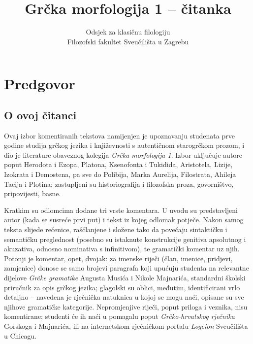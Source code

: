 \documentclass[a4paper,12pt,twoside]{report}
\newcommand{\subtitle}[1]{%
  \posttitle{%
    \par\end{center}
    \begin{center}\large#1\end{center}
    \vskip0.5em}%
}
\begin{document}
\title{Grčka morfologija 1 – čitanka}
\subtitle{Vježbe 1–20}
\author{Odsjek za klasičnu filologiju\\
Filozofski fakultet Sveučilišta u Zagrebu}
\maketitle

\clearpage
\thispagestyle{empty}




\chapter*{Predgovor}

\section*{O ovoj čitanci}

Ovaj izbor komentiranih tekstova namijenjen je upoznavanju studenata prve godine studija grčkog jezika i književnosti s autentičnom starogrčkom prozom, i dio je literature obaveznog kolegija \textit{Grčka morfologija 1}. Izbor uključuje autore poput Herodota i Ezopa, Platona, Ksenofonta i Tukidida, Aristotela, Lizije, Izokrata i Demostena, pa sve do Polibija, Marka Aurelija, Filostrata, Ahileja Tacija i Plotina; zastupljeni su historiografija i filozofska proza, govorništvo, pripovijesti, basne.

Kratkim su odlomcima dodane tri vrste komentara. U uvodu su predstavljeni autor (kada se susreće prvi put) i tekst iz kojeg odlomak potječe. Nakon samog teksta slijede rečenice, raščlanjene i složene tako da povećaju sintaktičku i semantičku preglednost (posebno su istaknute konstrukcije genitiva apsolutnog i akuzativa, odnosno nominativa s infinitivom), te gramatički komentar uz njih. Potonji je komentar, opet, dvojak: za imenske riječi (član, imenice, pridjevi, zamjenice) donose se samo brojevi paragrafa koji upućuju studenta na relevantne dijelove \textit{Grčke gramatike} Augusta Musića i Nikole Majnarića, standardni školski priručnik za opis grčkog jezika; glagolski su oblici, međutim, identificirani vrlo detaljno – navedena je rječnička natuknica u kojoj se mogu naći, opisane su sve njihove gramatičke kategorije. Nepromjenjive riječi, poput priloga i veznika, nisu komentirane; studenti će ih naći u pomagalu poput \textit{Grčko-hrvatskog rječnika} Gorskoga i Majnarića, ili na internetskom rječničkom portalu \textit{Logeion} Sveučilišta u Chicagu.
\end{document}
